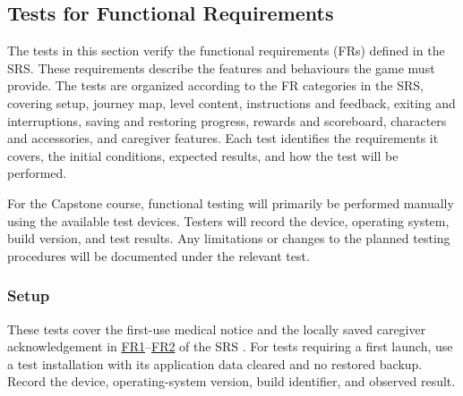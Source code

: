 \documentclass[10pt,titlepage]{article}
\newcommand{\srsurl}{https://team-hindsight.github.io/ophthamology-game/SRS/SRS.pdf}
\newcommand{\srsfrref}[2]{\href{\srsurl\#nameddest=#1}{FR#2}}
\begin{document}
\subsection{Tests for Functional Requirements}\label{sec:FRSystemTests}

The tests in this section verify the functional requirements (FRs)
defined in the SRS. These requirements describe the features and
behaviours the game must provide. The tests are organized according
to the FR categories in the SRS, covering setup, journey map,
level content, instructions and feedback, exiting and interruptions,
saving and restoring progress, rewards and scoreboard, characters
and accessories, and caregiver features. Each test identifies the
requirements it covers, the initial conditions, expected results,
and how the test will be performed.

For the Capstone course, functional testing will primarily be
performed manually using the available test devices. Testers will
record the device, operating system, build version, and test
results. Any limitations or changes to the planned testing
procedures will be documented under the relevant test.

\subsubsection{Setup}\label{sec:AMSetupFRTests}

These tests cover the first-use medical notice and the locally saved
caregiver acknowledgement in \srsfrref{FR_MedicalNotice}{1}--\srsfrref{FR_RecordAck}{2} of the SRS \cite{SRS}.
For tests requiring a first launch, use a test installation with its
application data cleared and no restored backup. Record the device,
operating-system version, build identifier, and observed result.
\end{document}
